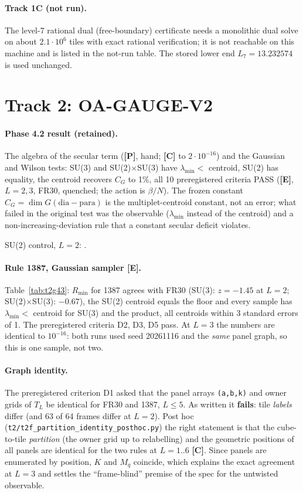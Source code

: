 \documentclass[10pt]{article}
\newcommand{\lab}[1]{\textbf{[#1]}}
\begin{document}
\paragraph{Track 1C (not run).} The level-7 rational dual (free-boundary) certificate needs a monolithic dual solve on about $2.1\cdot10^6$ tiles with exact rational verification; it is not reachable on this machine and is listed in the not-run table. The stored lower end $L_7=13.232574$ is used unchanged.

\section{Track 2: OA-GAUGE-V2}\label{sec:t2}
\paragraph{Phase 4.2 result (retained).} The algebra of the secular term (\lab{P}, hand; \lab{C} to $2\cdot10^{-16}$) and the Gaussian and Wilson tests: SU(3) and SU(2)$\times$SU(3) have $\lambda_{\min}<$ centroid, SU(2) has equality, the centroid recovers $C_G$ to 1\%, all 10 preregistered criteria PASS (\lab{E}, $L=2,3$, FR30, quenched; the action is $\beta/N$). The frozen constant $C_G=\dim G(\mathrm{dia}-\mathrm{para})$ is the multiplet-centroid constant, not an error; what failed in the original test was the observable ($\lambda_{\min}$ instead of the centroid) and a non-increasing-deviation rule that a constant secular deficit violates.


SU(2) control, $L=2$: .

\paragraph{Rule 1387, Gaussian sampler \lab{E}.} Table~\ref{tab:t2g43}: $R_{\min}$ for 1387 agrees with FR30 (SU(3): $z=-1.45$ at $L=2$; SU(2)$\times$SU(3): $-0.67$), the SU(2) centroid equals the floor and every sample has $\lambda_{\min}<$ centroid for SU(3) and the product, all centroids within $3$ standard errors of 1. The preregistered criteria D2, D3, D5 pass. At $L=3$ the numbers are identical to $10^{-16}$: both runs used seed 20261116 and the \emph{same} panel graph, so this is one sample, not two.


\paragraph{Graph identity.} The preregistered criterion D1 asked that the panel arrays \texttt{(a,b,k)} and owner grids of $T_L$ be identical for FR30 and 1387, $L\le5$. As written it \textbf{fails}: tile \emph{labels} differ (and 63 of 64 frames differ at $L=2$). Post hoc (\texttt{t2/t2f\_partition\_identity\_posthoc.py}) the right statement is that the cube-to-tile \emph{partition} (the owner grid up to relabelling) and the geometric positions of all panels are identical for the two rules at $L=1..6$ \lab{C}. Since panels are enumerated by position, $K$ and $M_q$ coincide, which explains the exact agreement at $L=3$ and settles the ``frame-blind'' premise of the spec for the untwisted observable.
\end{document}
